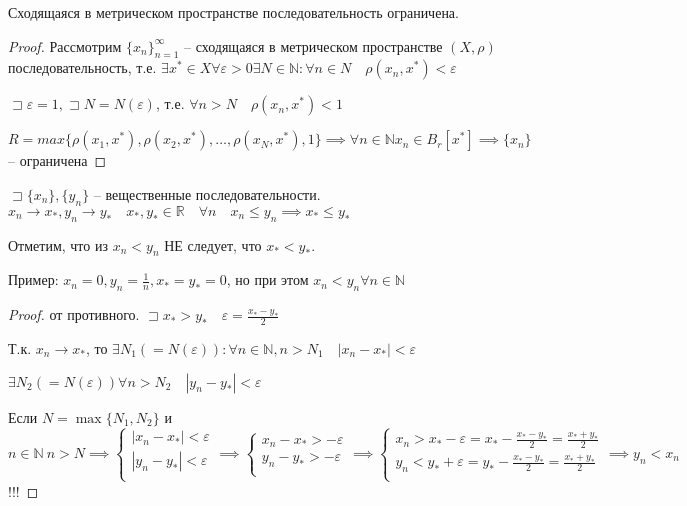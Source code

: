 \documentclass{book}
\newcommand\N{\ensuremath{\mathbb{N}}}
\newcommand\R{\ensuremath{\mathbb{R}}}
\theoremstyle{definition}
\begin{document}
    \begin{theorem}
        Сходящаяся в метрическом пространстве последовательность ограничена.
    \end{theorem}
    \begin{proof}
        Рассмотрим $\{x_n\}_{n=1}^{\infty }$ -- сходящаяся в метрическом пространстве $(X,\rho)$ последовательность, т.е. $\exists x^*\in X\forall \varepsilon>0 \exists N\in \N :\forall n\in N \quad\rho( x_n,x^*)<\varepsilon$

        $\sqsupset \varepsilon = 1, \sqsupset N = N(\varepsilon)$, т.е. $\forall n>N\quad \rho(x_n, x^*)<1$

        $R = max\{\rho(x_1, x^*), \rho(x_2, x^*), \ldots, \rho(x_N, x^*), 1\} \implies \forall n\in \N  x_{n} \in B_r[x^*] \implies \{x_n\}$ -- ограничена
    \end{proof}

    \begin{theorem}

        $\sqsupset \{x_{n} \}, \{y_{n} \}$ -- вещественные последовательности. $x_n\to x_*, y_n\to y_*\quad x_*, y_*\in \R\quad \forall n\quad x_{n} \leqslant y_{n} \implies  x_*\leqslant y_*$

        Отметим, что из $x_{n} <y_{n} $ НЕ следует, что $x_*<y_*$.

        Пример: $x_{n} =0, y_{n}  = \frac{1}{n}, x_* = y_* =  0$, но при этом $x_n<y_n \forall n\in \N $
    \end{theorem}
    \begin{proof}
        от противного. $\sqsupset  x_*>y_*\quad \varepsilon = \frac{x_*-y_*}{2}$

        Т.к. $x_{n} \to x_*$, то $\exists N_1\left( =N(\varepsilon) \right): \forall n\in \N , n>N_1\quad \left| x_n-x_* \right| <\varepsilon $

        $\exists N_2\left( =N(\varepsilon) \right) \forall n>N_2\quad \left| y_n-y_* \right| <\varepsilon$

        Если $N = \max\{N_1, N_2\}$ и $n\in \N ~n>N \implies \begin{cases}
            \left| x_n-x_* \right| <\varepsilon\\
            \left| y_n-y_* \right| <\varepsilon\\
        \end{cases} \implies \begin{cases}
            x_n-x_* >-\varepsilon\\
            y_n-y_* >-\varepsilon\\
        \end{cases} \implies \begin{cases}
            x_n>x_*-\varepsilon = x_* - \frac{x_*-y_*}{2} = \frac{x_*+y_*}{2}\\
            y_n<y_*+\varepsilon = y_* - \frac{x_*-y_*}{2} = \frac{x_*+y_*}{2}\\
        \end{cases} \implies  y_n<x_n$ !!!
    \end{proof}
\end{document}
